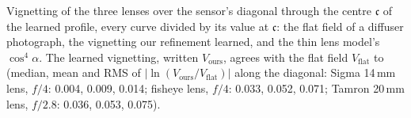 Vignetting of the three lenses over the sensor's diagonal through the centre $\mathfrak{c}$ of the learned profile, every curve divided by its value at $\mathfrak{c}$: the flat field of a diffuser photograph, the vignetting our refinement learned, and the thin lens model's $\cos^4\alpha$. The learned vignetting, written $V_{\mathrm{ours}}$, agrees with the flat field $V_{\mathrm{flat}}$ to (median, mean and RMS of $|\ln(V_{\mathrm{ours}} / V_{\mathrm{flat}})|$ along the diagonal: Sigma 14\,mm lens, $f/4$: 0.004, 0.009, 0.014; fisheye lens, $f/4$: 0.033, 0.052, 0.071; Tamron 20\,mm lens, $f/2.8$: 0.036, 0.053, 0.075).
